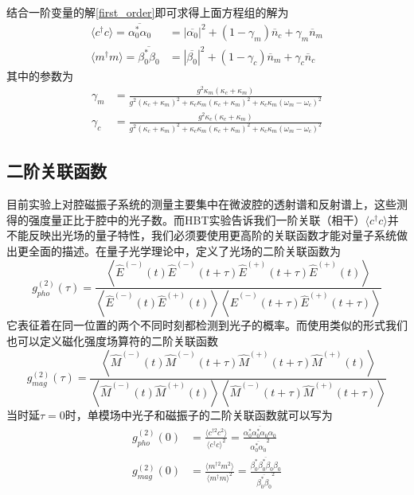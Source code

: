 结合一阶变量的解\eqref{first_order}即可求得上面方程组的解为
\begin{align}
\langle c^{\dag}c \rangle = \overline{\alpha_{0}^{*}\alpha_{0}}&=|\overline{\alpha_{0}}|^{2}+(1-\gamma_{m})\overline{n}_c+\gamma_{m}\overline{n}_m \label{photon_num} \\
\langle m^{\dag}m \rangle = \overline{\beta_{0}^{*}\beta_{0}}&=|\overline{\beta_{0}}|^{2}+(1-\gamma_{c})\overline{n}_m+\gamma_{c}\overline{n}_c \label{magnon_num}
\end{align}
其中的参数为
\begin{align}
\gamma_m&=\frac{g^2\kappa_m(\kappa_c+\kappa_m)}{g^2(\kappa_c+\kappa_m)^2+\kappa_c\kappa_m(\kappa_c+\kappa_m)^2+\kappa_c\kappa_m(\omega_{m}-\omega_{c})^2} \\
\gamma_c&=\frac{g^2\kappa_c(\kappa_c+\kappa_m)}{g^2(\kappa_c+\kappa_m)^2+\kappa_c\kappa_m(\kappa_c+\kappa_m)^2+\kappa_c\kappa_m(\omega_{m}-\omega_{c})^2}
\end{align}

\subsection{二阶关联函数}
目前实验上对腔磁振子系统的测量主要集中在微波腔的透射谱和反射谱上，这些测得的强度量正比于腔中的光子数\cite{harder2016study}。而HBT实验告诉我们一阶关联（相干）$\langle c^{\dag}c \rangle$并不能反映出光场的量子特性，我们必须要使用更高阶的关联函数才能对量子系统做出更全面的描述。在量子光学理论中，定义了光场的二阶关联函数为\cite{gerry2005introductory}
\begin{equation}
g^{(2)}_{pho}(\tau)=\frac{\left\langle\hat{E}^{(-)}(t) \hat{E}^{(-)}(t+\tau) \hat{E}^{(+)}(t+\tau) \hat{E}^{(+)}(t)\right\rangle}{\left\langle\hat{E}^{(-)}(t) \hat{E}^{(+)}(t)\right\rangle\left\langle\hat{E}^{(-)}(t+\tau) \hat{E}^{(+)}(t+\tau)\right\rangle}
\end{equation}
它表征着在同一位置的两个不同时刻都检测到光子的概率。而使用类似的形式我们也可以定义磁化强度场算符的二阶关联函数
\begin{equation}
g^{(2)}_{mag}(\tau)=\frac{\left\langle\hat{M}^{(-)}(t) \hat{M}^{(-)}(t+\tau) \hat{M}^{(+)}(t+\tau) \hat{M}^{(+)}(t)\right\rangle}{\left\langle\hat{M}^{(-)}(t) \hat{M}^{(+)}(t)\right\rangle\left\langle\hat{M}^{(-)}(t+\tau) \hat{M}^{(+)}(t+\tau)\right\rangle}
\end{equation}
当时延$\tau=0$时，单模场中光子和磁振子的二阶关联函数就可以写为
\begin{align}
g_{pho}^{(2)}(0) & = \frac{\langle c^{\dag2}c^2\rangle}{\langle c^{\dag}c\rangle^2} =\frac{\overline{\alpha_{0}^{*}\alpha_{0}^{*}\alpha_{0}\alpha_{0}}}{\overline{\alpha_{0}^{*}\alpha_{0}}^2} \\
g_{mag}^{(2)}(0) & =\frac{\langle m^{\dag2}m^2\rangle}{\langle m^{\dag}m\rangle^2} =\frac{\overline{\beta_{0}^{*}\beta_{0}^{*}\beta_{0}\beta_{0}}}{\overline{\beta_{0}^{*}\beta_{0}}^2}
\end{align}

